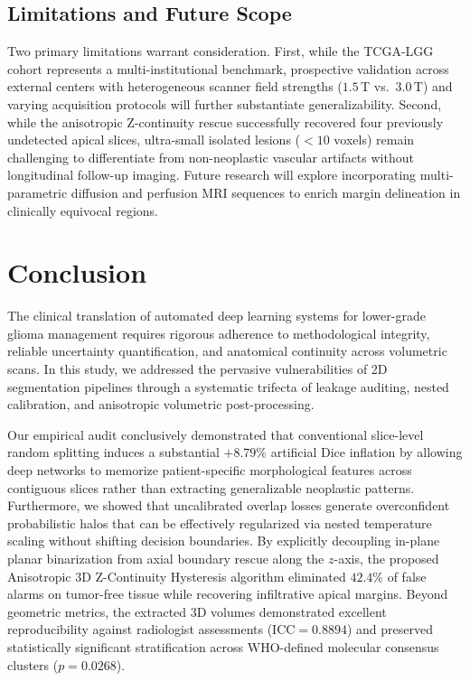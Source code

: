 \documentclass[preprint,3p,times,onecolumn]{elsarticle}
\begin{document}
\subsection{Limitations and Future Scope}
Two primary limitations warrant consideration. First, while the TCGA-LGG cohort represents a multi-institutional benchmark, prospective validation across external centers with heterogeneous scanner field strengths ($1.5$\,T vs.\ $3.0$\,T) and varying acquisition protocols will further substantiate generalizability. Second, while the anisotropic Z-continuity rescue successfully recovered four previously undetected apical slices, ultra-small isolated lesions ($< 10$ voxels) remain challenging to differentiate from non-neoplastic vascular artifacts without longitudinal follow-up imaging. Future research will explore incorporating multi-parametric diffusion and perfusion MRI sequences to enrich margin delineation in clinically equivocal regions.

\section{Conclusion}
\label{sec:conclusion}
The clinical translation of automated deep learning systems for lower-grade glioma management requires rigorous adherence to methodological integrity, reliable uncertainty quantification, and anatomical continuity across volumetric scans. In this study, we addressed the pervasive vulnerabilities of 2D segmentation pipelines through a systematic trifecta of leakage auditing, nested calibration, and anisotropic volumetric post-processing.

Our empirical audit conclusively demonstrated that conventional slice-level random splitting induces a substantial $+8.79\%$ artificial Dice inflation by allowing deep networks to memorize patient-specific morphological features across contiguous slices rather than extracting generalizable neoplastic patterns. Furthermore, we showed that uncalibrated overlap losses generate overconfident probabilistic halos that can be effectively regularized via nested temperature scaling without shifting decision boundaries. By explicitly decoupling in-plane planar binarization from axial boundary rescue along the $z$-axis, the proposed Anisotropic 3D Z-Continuity Hysteresis algorithm eliminated $42.4\%$ of false alarms on tumor-free tissue while recovering infiltrative apical margins. Beyond geometric metrics, the extracted 3D volumes demonstrated excellent reproducibility against radiologist assessments ($\text{ICC} = 0.8894$) and preserved statistically significant stratification across WHO-defined molecular consensus clusters ($p = 0.0268$). 
\end{document}
